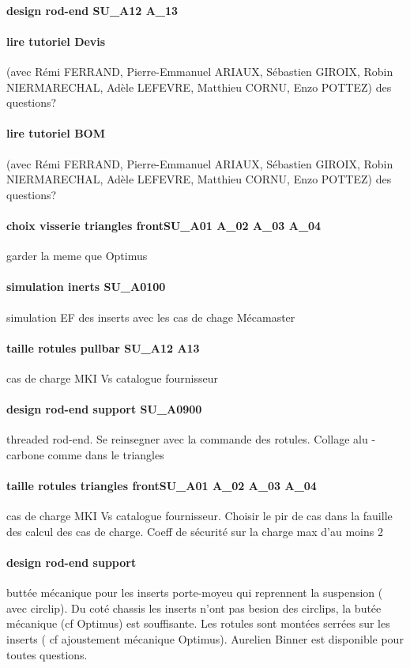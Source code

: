 \paragraph{design rod-end SU\_A12 A\_13} 
\paragraph{lire tutoriel Devis} (avec Rémi FERRAND, Pierre-Emmanuel ARIAUX, Sébastien GIROIX, Robin NIERMARECHAL, Adèle LEFEVRE, Matthieu CORNU, Enzo POTTEZ) des questions?
\paragraph{lire tutoriel BOM} (avec Rémi FERRAND, Pierre-Emmanuel ARIAUX, Sébastien GIROIX, Robin NIERMARECHAL, Adèle LEFEVRE, Matthieu CORNU, Enzo POTTEZ) des questions?
\paragraph{choix visserie triangles frontSU\_A01 A\_02 A\_03 A\_04} garder la meme que Optimus
\paragraph{simulation inerts SU\_A0100} simulation EF des inserts avec les cas de chage Mécamaster
\paragraph{taille rotules pullbar SU\_A12 A13} cas de charge MKI Vs catalogue fournisseur
\paragraph{design rod-end support SU\_A0900} threaded rod-end. Se reinsegner avec la commande des rotules. Collage alu - carbone comme dans le triangles
\paragraph{taille rotules triangles frontSU\_A01 A\_02 A\_03 A\_04} cas de charge MKI Vs catalogue fournisseur. Choisir le pir de cas dans la fauille des calcul des cas de charge. Coeff de sécurité sur la charge max d'au moins 2
\paragraph{design rod-end support} buttée mécanique pour les inserts porte-moyeu qui reprennent la suspension ( avec circlip). Du coté chassis les inserts n'ont pas besion des circlips, la butée mécanique (cf Optimus) est souffisante. Les rotules sont montées serrées sur les inserts ( cf ajoustement mécanique Optimus). Aurelien Binner est disponible pour toutes questions.
